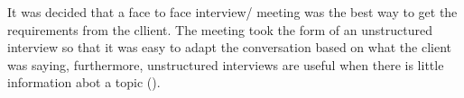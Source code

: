 It was decided that a face to face interview/ meeting was the best way to get the requirements from the cllient. The meeting took the form of an unstructured interview so that it was easy to adapt the conversation based on what the client was saying, furthermore, unstructured interviews are useful when there is little information abot a topic (\cite{easwaramoorthy2006interviewing}). 


